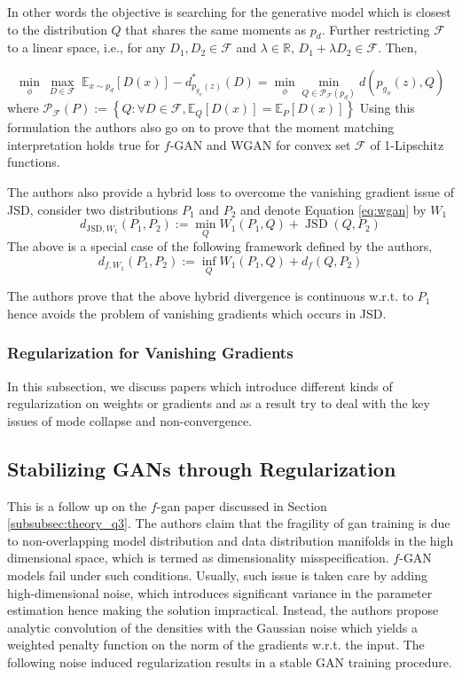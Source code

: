 In other words the objective is searching for the generative model which is closest to the distribution $Q$ that shares the same moments as $p_d$. Further restricting $\mathcal{F}$ to a linear space, i.e., for any $D_1, D_2 \in \mathcal{F}$ and $\lambda \in \mathbb{R}$, $D_1 + \lambda D_2 \in \mathcal{F}$. Then, 

$$
\min _{\phi} \  \max _{D \in \mathcal{F}} \ \mathbb{E}_{x\sim p_d}[D(x)]-d_{p_{g_{\phi}}(z)}^{*}(D)=\min _{\phi} \min _{Q \in \mathcal{P}_{\mathcal{F}}\left(p_{d}\right)} d\left(p_{g_{\phi}}(z), Q\right)
$$
where $
\mathcal{P}_{\mathcal{F}}(P) :=\left\{Q : \forall D \in \mathcal{F}, \mathbb{E}_{Q}[D(x)]=\mathbb{E}_{P}[D(x)]\right\}
$
Using this formulation the authors also go on to prove that the moment matching interpretation holds true for $f$-GAN and WGAN for convex set $\mathcal{F}$ of 1-Lipschitz functions. 

The authors also provide a hybrid loss to overcome the vanishing gradient issue of JSD, consider two distributions $P_1$ and $P_2$ and denote Equation \ref{eq:wgan} by $W_1$
$$
d_{\mathrm{JSD}, W_{1}}\left(P_{1}, P_{2}\right) :=\min _{Q} W_{1}\left(P_{1}, Q\right)+\operatorname{JSD}\left(Q, P_{2}\right)
$$ The above is a special case of the following framework defined by the authors,
$$
d_{f, W_{1}}\left(P_{1}, P_{2}\right) :=\inf _{Q} W_{1}\left(P_{1}, Q\right)+d_{f}\left(Q, P_{2}\right)
$$

The authors prove that the above hybrid divergence is continuous w.r.t. to $P_1$ hence avoids the problem of vanishing gradients which occurs in JSD.







\subsubsection{Regularization for Vanishing Gradients} 
\label{subsubsec:loss_reg}In this subsection, we discuss papers which introduce different kinds of regularization on weights or gradients and as a result try to deal with the key issues of mode collapse and non-convergence. 

\subsection*{Stabilizing GANs through Regularization \citep{fgan_2}} 
This is a follow up on the $f$-gan paper \citep{fgan} discussed in Section \ref{subsubsec:theory_q3}. The authors claim that the fragility of gan training is due to non-overlapping model distribution and data distribution manifolds in the high dimensional space, which is termed as dimensionality misspecification. $f$-GAN models fail under such conditions.
Usually, such issue is taken care by adding high-dimensional noise, which introduces significant variance in the parameter estimation hence making the solution impractical. Instead, the authors propose analytic convolution of the densities with the Gaussian noise which yields a weighted penalty function on the norm of the gradients w.r.t. the input.
The following noise induced regularization results in a stable GAN training procedure. 

